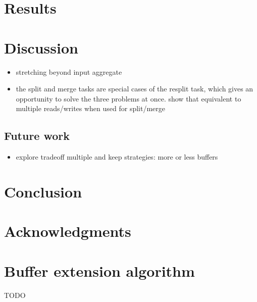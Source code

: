 \documentclass[conference]{IEEEtran}
\begin{document}
\section{Results}

\section{Discussion}

\begin{itemize}
  \item stretching beyond input aggregate
  \item the split and merge tasks are special cases of the resplit task, which
  gives an opportunity to solve the three problems at once. show that equivalent
  to multiple reads/writes when used for split/merge
\end{itemize}

\subsection{Future work}
\begin{itemize}
  \item explore tradeoff multiple and keep strategies: more or less buffers
\end{itemize}

\section{Conclusion}

\section{Acknowledgments}




\appendices

\section{Buffer extension algorithm}
\label{bufferExtensionAlgorithm}
TODO
\end{document}
